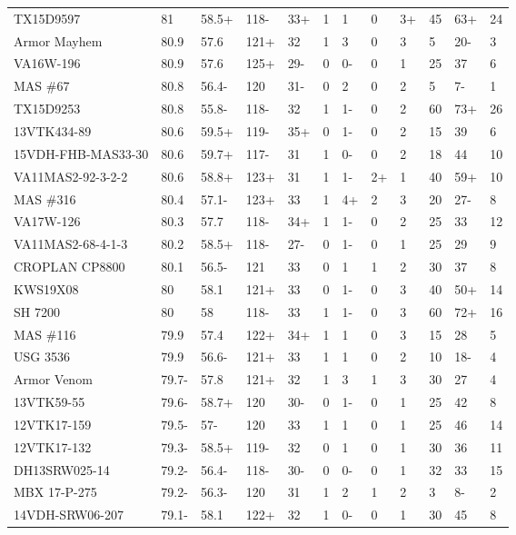 \documentclass[12pt, letterpaper]{article}
\begin{document}
\begin{landscape}
\begin{ThreePartTable}
\begin{longtable}{llllllllllll}
  TX15D9597 & 81 & 58.5+ & 118- & 33+ & 1 & 1 & 0 & 3+ & 45 & 63+ & 24 \\ 
  Armor Mayhem & 80.9 & 57.6 & 121+ & 32 & 1 & 3 & 0 & 3 & 5 & 20- & 3 \\ 
  VA16W-196 & 80.9 & 57.6 & 125+ & 29- & 0 & 0- & 0 & 1 & 25 & 37 & 6 \\ 
  MAS \#67 & 80.8 & 56.4- & 120 & 31- & 0 & 2 & 0 & 2 & 5 & 7- & 1 \\ 
  TX15D9253 & 80.8 & 55.8- & 118- & 32 & 1 & 1- & 0 & 2 & 60 & 73+ & 26 \\ 
  13VTK434-89 & 80.6 & 59.5+ & 119- & 35+ & 0 & 1- & 0 & 2 & 15 & 39 & 6 \\ 
  15VDH-FHB-MAS33-30 & 80.6 & 59.7+ & 117- & 31 & 1 & 0- & 0 & 2 & 18 & 44 & 10 \\ 
  VA11MAS2-92-3-2-2 & 80.6 & 58.8+ & 123+ & 31 & 1 & 1- & 2+ & 1 & 40 & 59+ & 10 \\ 
  MAS \#316 & 80.4 & 57.1- & 123+ & 33 & 1 & 4+ & 2 & 3 & 20 & 27- & 8 \\ 
  VA17W-126 & 80.3 & 57.7 & 118- & 34+ & 1 & 1- & 0 & 2 & 25 & 33 & 12 \\ 
  VA11MAS2-68-4-1-3 & 80.2 & 58.5+ & 118- & 27- & 0 & 1- & 0 & 1 & 25 & 29 & 9 \\ 
  CROPLAN CP8800 & 80.1 & 56.5- & 121 & 33 & 0 & 1 & 1 & 2 & 30 & 37 & 8 \\ 
  KWS19X08 & 80 & 58.1 & 121+ & 33 & 0 & 1- & 0 & 3 & 40 & 50+ & 14 \\ 
  SH 7200 & 80 & 58 & 118- & 33 & 1 & 1- & 0 & 3 & 60 & 72+ & 16 \\ 
  MAS \#116 & 79.9 & 57.4 & 122+ & 34+ & 1 & 1 & 0 & 3 & 15 & 28 & 5 \\ 
  USG 3536 & 79.9 & 56.6- & 121+ & 33 & 1 & 1 & 0 & 2 & 10 & 18- & 4 \\ 
  Armor Venom & 79.7- & 57.8 & 121+ & 32 & 1 & 3 & 1 & 3 & 30 & 27 & 4 \\ 
  13VTK59-55 & 79.6- & 58.7+ & 120 & 30- & 0 & 1- & 0 & 1 & 25 & 42 & 8 \\ 
  12VTK17-159 & 79.5- & 57- & 120 & 33 & 1 & 1 & 0 & 1 & 25 & 46 & 14 \\ 
  12VTK17-132 & 79.3- & 58.5+ & 119- & 32 & 0 & 1 & 0 & 1 & 30 & 36 & 11 \\ 
  DH13SRW025-14 & 79.2- & 56.4- & 118- & 30- & 0 & 0- & 0 & 1 & 32 & 33 & 15 \\ 
  MBX 17-P-275 & 79.2- & 56.3- & 120 & 31 & 1 & 2 & 1 & 2 & 3 & 8- & 2 \\ 
  14VDH-SRW06-207 & 79.1- & 58.1 & 122+ & 32 & 1 & 0- & 0 & 1 & 30 & 45 & 8 \\ 

\end{longtable}
\end{ThreePartTable}
\end{landscape}
\end{document}
